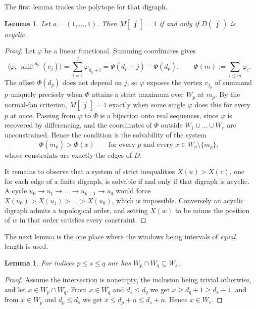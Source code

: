 \documentclass[11pt, a4paper, abstract=yes]{scrartcl}
\theoremstyle{definition}
\theoremstyle{remark}
\theoremstyle{plain}
\newtheorem{lemma}[definition]{Lemma}
\newcommand{\shift}{\operatorname{shift}}
\begin{document}
The first lemma trades the polytope for that digraph.

\begin{lemma}
Let \(a=(1,\dots,1)\). Then \(M[\vec\jmath]=1\) if and only if \(D(\vec\jmath)\) is acyclic.
\label{orgf5c2e7b}
\end{lemma}

\begin{proof}
Let \(\varphi\) be a linear functional. Summing coordinates gives
\[
  \bigl\langle\varphi,\ \shift^{d_p}(v_j)\bigr\rangle=\sum_{i=1}^{j}\varphi_{d_p+i}
  =\Phi(d_p+j)-\Phi(d_p),
  \qquad
  \Phi(m):=\sum_{i\le m}\varphi_i .
\]
The offset \(\Phi(d_p)\) does not depend on \(j\), so \(\varphi\) exposes the vertex \(v_{j_p}\) of
summand \(p\) uniquely precisely when \(\Phi\) attains a strict maximum over \(W_p\) at \(m_p\). By
the normal-fan criterion, \(M[\vec\jmath]=1\) exactly when some single \(\varphi\) does this for
every \(p\) at once. Passing from \(\varphi\) to \(\Phi\) is a bijection onto real sequences, since
\(\varphi\) is recovered by differencing, and the coordinates of \(\Phi\) outside
\(W_1\cup\dots\cup W_r\) are unconstrained. Hence the condition is the solvability of the system
\[
  \Phi(m_p)>\Phi(x)
  \qquad\text{for every }p\text{ and every }x\in W_p\setminus\{m_p\},
\]
whose constraints are exactly the edges of \(D\).

It remains to observe that a system of strict inequalities \(X(u)>X(v)\), one for each edge of a
finite digraph, is solvable if and only if that digraph is acyclic. A cycle
\(u_0\to u_1\to\dots\to u_{k-1}\to u_0\) would force \(X(u_0)>X(u_1)>\dots>X(u_0)\), which is
impossible. Conversely an acyclic digraph admits a topological order, and setting \(X(w)\) to be
minus the position of \(w\) in that order satisfies every constraint.
\end{proof}

The next lemma is the one place where the windows being intervals of \emph{equal} length is used.

\begin{lemma}
For indices \(p\le s\le q\) one has \(W_p\cap W_q\subseteq W_s\).
\label{org484b196}
\end{lemma}

\begin{proof}
Assume the intersection is nonempty, the inclusion being trivial otherwise, and let
\(x\in W_p\cap W_q\). From \(x\in W_q\) and \(d_s\le d_q\) we get \(x\ge d_q+1\ge d_s+1\), and from
\(x\in W_p\) and \(d_p\le d_s\) we get \(x\le d_p+n\le d_s+n\). Hence \(x\in W_s\).
\end{proof}
\end{document}
